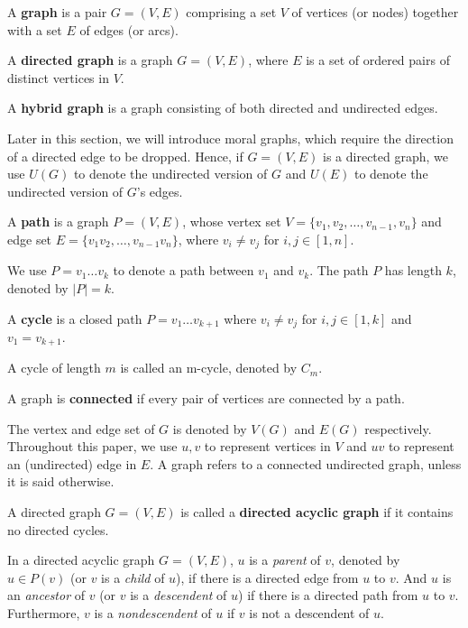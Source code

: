 \begin{definition}
\label{def:graph}
A \textbf{graph} is a pair $G = (V, E)$ comprising a set $V$ of vertices (or nodes) together with a set $E$ of edges (or arcs).
\end{definition}

\begin{definition}
\label{def:digraph}
A \textbf{directed graph} is a graph $G=(V,E)$, where $E$ is a set of ordered pairs of distinct vertices in $V$.
\end{definition} 

\begin{definition}
\label{def:hybrid_g}
A \textbf{hybrid graph} is a graph consisting of both directed and undirected edges. 
\end{definition}
Later in this section, we will introduce moral graphs, which require the direction of a directed edge to be dropped. Hence, if $G=(V,E)$ is a directed graph, we use $U(G)$ to denote the undirected version of $G$ and $U(E)$ to denote the undirected version of $G$'s edges. 

\begin{definition}
A \textbf{path} is a graph $P=(V,E)$, whose vertex set $V=\{v_1,v_2,\dots,v_{n-1},v_n\}$ and edge set $E=\{v_1v_2,\dots,v_{n-1}v_n\}$, where $v_i\neq v_j$ for $i,j \in [1,n]$.
\end{definition}
We use $P=v_1\dots v_k$ to denote a path between $v_1$ and $v_k$. The path $P$ has length $k$, denoted by $|P|=k$.

\begin{definition}
A \textbf{cycle} is a closed path $P=v_1\dots v_{k+1}$ where $v_i\neq v_j$ for $i,j \in [1,k]$ and $v_1=v_{k+1}$. 
\end{definition}
A cycle of length $m$ is called an m-cycle, denoted by $C_m$. 

\begin{definition}
A graph is \textbf{connected} if every pair of vertices are connected by a path. 
\end{definition}
The vertex and edge set of $G$ is denoted by $V(G)$ and $E(G)$ respectively. Throughout this paper, we use $u,v$ to represent vertices in $V$ and $uv$ to represent an (undirected) edge in $E$. A graph refers to a connected undirected graph, unless it is said otherwise. 

\begin{definition}
\label{def:dag}
A directed graph $G = (V, E)$ is called a \textbf{directed acyclic graph} if it contains no directed cycles. 
\end{definition}
In a directed acyclic graph $G=(V,E)$, $u$ is a \textit{parent} of $v$, denoted by $u \in P(v)$ (or $v$ is a \textit{child} of $u$), if there is a directed edge from $u$ to $v$. And $u$ is an \textit{ancestor} of $v$ (or $v$ is a \textit{descendent} of $u$) if there is a directed path from $u$ to $v$. Furthermore, $v$ is a \textit{nondescendent} of $u$ if $v$ is not a descendent of $u$.

